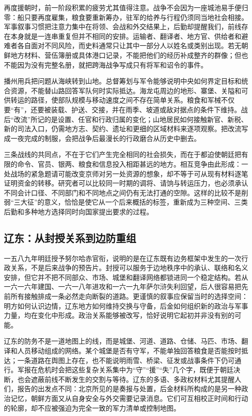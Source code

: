 再度援朝时，前一阶段积累的疲劳尤其值得注意。战争不会因为一座城池易手便归零：船只要再度雇集，粮食要重新筹办，驻军的给养与行程仍须同当地社会相接。军事叙事习惯把注意力集中在将领、会战和外交结果上，后勤却提醒我们，前线存在本身就是一连串重复但并不相同的安排。运输者、翻译者、地方官、供给者和避难者各自面对不同风险，而史料通常只让其中一部分人以姓名或类别出现。若无朝鲜地方材料、营伍簿册或具体港口记录，不能把他们的经历补成整齐的群像；但也不能因为没有完整名册，就把跨海战争写成只有将军和诏令的事件。

播州用兵把问题从海峡转到山地。总督筹划与军令能够说明中央如何界定目标和统合资源，不能替山路回答军队何时实际抵达。海龙屯周边的地形、寨堡、关隘和可供转运的路径，使部队规模与移动速度之间不存在简单关系。粮食和军械不仅要“有”，还要被装载、护送、交接，并在雨季、坡道或敌对据点的条件下维持。战后“改流”所记的是设置、任官和行政归属的变化；山地居民如何接触新官、新税、新的司法入口，仍需地方志、契约、遗址和更细的区域材料来逐项观察。把改流写成一夜完成的制服，会把战争后最漫长的行政磨合从历史中删去。

三条战线的共同点，不在于它们产生完全相同的社会损失，而在于都迫使朝廷把有限的命令、官员、银两、粮食和信息投入相距甚远的地方。相互竞争由此形成：一处战场的紧急题请可能改变京师对另一处资源的想象，却不等于可从现有材料逐笔证明资金的转移。研究者可以比较同一时期的调将、请饷与转运压力，也必须承认不同会计口径、不同部门和不同地点之间仍有无法打通的空隙。这样的比较不是削弱“三大征”的意义，恰恰是使它从一个后来概括的标签，重新成为三种空间、三类后勤和多种地方选择同时向国家提出要求的过程。

\subsection{辽东：从封授关系到边防重组}

一五八九年明廷授予努尔哈赤官衔，说明的是在辽东既有边务框架中发生的一次行政关系，不是后来战争的预告片。封授可以服务于边地秩序中的承认、联络和名义安排，但它并不把不同部众、市场、城堡和翻译网络都锁进同一个稳定结构。若从一六一六年建国、一六一八年进攻和一六一九年萨尔浒失利回望，后人很容易把先前所有接触排成一条必然走向断裂的道路。更谨慎的叙事应保留当时的选择空间：明方如何认识边情，辽东地方如何维持交换与守备，后金如何组织新的政治与军事力量，均在变化中形成。政治关系能够被改写，恰好说明它起初并非没有别的可能。

辽东的防务不是一道地图上的线，而是城堡、河道、道路、仓储、马匹、市场、翻译和人员移动组成的网络。某个城堡是否有守军，不能单独回答粮食是否能按时抵达；一条道路在舆图上存在，也不能说明雨雪、桥梁、征发或战事条件下仍可通行。军报在危机时会把这些复杂关系集中为“守”“援”“失”几个字，既便于朝廷决断，也会遮蔽前线不断发生的交割与等待。辽东的多语、多政权材料尤其提醒人们，报告的出发点不同：北京所见的是奏报与处置，后金材料所构成的是另一种政治记忆，朝鲜方面又从自身安全与外交需要记录消息。它们可互相校正时间和行动的轮廓，却不应被强迫为完全一致的军力清单或控制地图。

